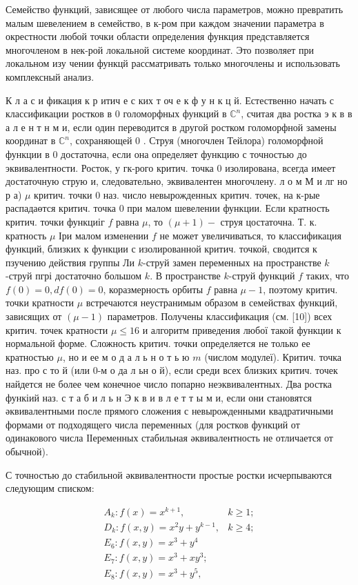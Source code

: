 \documentclass[10pt]{article}
\begin{document}
Семейство функций, зависящее от любого числа параметров, можно превратить малым шевелением в семейство, в к-ром при каждом значении параметра в окрестности любой точки области определения функция представляется многочленом в нек-рой локальной системе координат. Это позволяет при локальном изу чении функцй рассматривать только многочлены и использовать комплексный анализ.

К л а с и фикация к р итич е с ких т оч е к ф у н к ц й. Естественно начать с классификации ростков в 0 голоморфных функций в $\mathbb{C}^{n}$, считая два ростка э к в в а л е н т н м и, если один переводится в другой ростком голоморфной замены координат в $\mathbb{C}^{n}$, сохраняющей 0 . Струя (многочлен Тейлора) голоморфной функции в 0 достаточна, если она определяет функцию с точностью до эквивалентности. Росток, у гк-рого критич. точка 0 изолирована, всегда имеет достаточную струю и, следовательно, эквивалентен многочлену. л о м М и лг но р а) $\mu$ критич. точки 0 наз. число невырожденных критич. точек, на к-рые распадаөтся критич. точка 0 при малом шевелении функции. Если кратность критич. точки функциіг $f$ равна $\mu$, то $(\mu+1)-$ струя цостаточна. Т. к. кратность $\mu$ Іри малом изменении $f$ не может увеличиваться, то классификация функций, близких к функции с изолированной критич. точкой, сводится к пзучению действия группы Ли $k$-струй замен переменных на пространстве $k$-струй пгрі достаточно большом $k$. В пространстве $k$-струй функций $f$ таких, что $f(0)=0, d f(0)=0$, коразмерность орбиты $f$ равна $\mu-1$, поэтому критич. точки кратности $\mu$ встречаются неустранимым образом в семействах функций, зависящих от $(\mu-1)$ параметров. Получены классификация (см. [10]) всех критич. точек кратности $\mu \leqslant 16$ и алгоритм приведения любої такой функции к нормальной форме. Сложность критич. точки определяется не только ее кратностью $\mu$, но и ее м о д а л ь н о т ь ю $m$ (числом модулеї). Критич. точка наз. про с то й (или 0-м о да л ьн о й), если среди всех близких критич. точек найдется не более чем конечное число попарно неэквивалентных. Два ростка функіий наз. с т а б и л ь н Э к в и в л е т т ы м и, если они становятся әквивалентными после прямого сложения с невырожденными квадратичными формами от подходящего числа переменных (для ростков функций от одинакового числа ІІеременных стабильная әквивалентность не отличается от обычной).

С точностью до стабильной әквивалентности простые ростки исчерпываются следующим списком:

\[
\begin{array}{ll}
A_{k}: f(x)=x^{k+1}, & k \geqslant 1 ; \\
D_{k}: f(x, y)=x^{2} y+y^{k-1}, & k \geqslant 4 ; \\
E_{6}: f(x, y)=x^{3}+y^{4} & \\
E_{7}: f(x, y)=x^{3}+x y^{3} ; & \\
E_{8}: f(x, y)=x^{3}+y^{5}, &
\end{array}
\]
\end{document}
